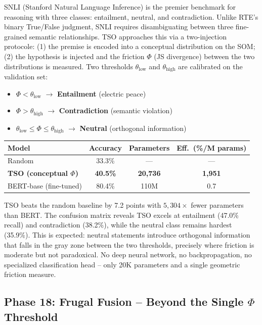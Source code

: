 \documentclass{article}
\begin{document}
SNLI (Stanford Natural Language Inference) is the premier benchmark for reasoning with three classes: entailment, neutral, and contradiction. Unlike RTE's binary True/False judgment, SNLI requires disambiguating between three fine-grained semantic relationships. TSO approaches this via a two-injection protocole: (1) the premise is encoded into a conceptual distribution on the SOM; (2) the hypothesis is injected and the friction $\Phi$ (JS divergence) between the two distributions is measured. Two thresholds $\theta_{\text{low}}$ and $\theta_{\text{high}}$ are calibrated on the validation set:
\begin{itemize}
    \item $\Phi < \theta_{\text{low}}$ $\rightarrow$ \textbf{Entailment} (electric peace)
    \item $\Phi > \theta_{\text{high}}$ $\rightarrow$ \textbf{Contradiction} (semantic violation)
    \item $\theta_{\text{low}} \leq \Phi \leq \theta_{\text{high}}$ $\rightarrow$ \textbf{Neutral} (orthogonal information)
\end{itemize}

\begin{center}
\begin{tabular}{lccc}
\toprule
Model & Accuracy & Parameters & Eff.\ (\%/M params) \\
\midrule
Random & 33.3\% & --- & --- \\
\textbf{TSO (conceptual $\Phi$)} & \textbf{40.5\%} & \textbf{20,736} & \textbf{1,951} \\
BERT-base (fine-tuned) & 80.4\% & 110M & 0.7 \\
\bottomrule
\end{tabular}
\end{center}

TSO beats the random baseline by 7.2 points with $5{,}304\times$ fewer parameters than BERT. The confusion matrix reveals TSO excels at entailment (47.0\% recall) and contradiction (38.2\%), while the neutral class remains hardest (35.9\%). This is expected: neutral statements introduce orthogonal information that falls in the gray zone between the two thresholds, precisely where friction is moderate but not paradoxical. No deep neural network, no backpropagation, no specialized classification head -- only 20K parameters and a single geometric friction measure.

\subsection{Phase 18: Frugal Fusion -- Beyond the Single $\Phi$ Threshold}
\end{document}
